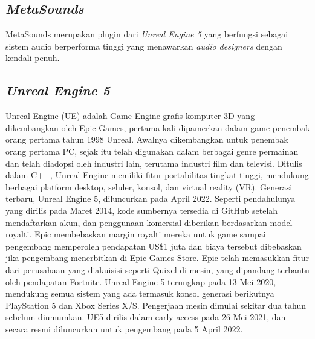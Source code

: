 \subsection{\emph{MetaSounds}}
MetaSounds merupakan plugin dari \emph{Unreal Engine 5} yang berfungsi sebagai sistem audio
berperforma tinggi yang menawarkan \emph{audio designers} dengan kendali penuh.

\subsection{\emph{Unreal Engine 5}}

Unreal Engine (UE) adalah Game Engine grafis komputer 3D yang dikembangkan oleh Epic Games, pertama kali dipamerkan dalam game penembak orang pertama tahun 1998 Unreal. 
Awalnya dikembangkan untuk penembak orang pertama PC, sejak itu telah digunakan dalam berbagai genre permainan dan telah diadopsi oleh industri lain, terutama industri film dan televisi. Ditulis dalam C++, 
Unreal Engine memiliki fitur portabilitas tingkat tinggi, mendukung berbagai platform desktop, seluler, konsol, dan virtual reality (VR).
Generasi terbaru, Unreal Engine 5, diluncurkan pada April 2022. Seperti pendahulunya yang dirilis pada Maret 2014, kode sumbernya tersedia di GitHub setelah mendaftarkan akun, dan penggunaan komersial diberikan 
berdasarkan model royalti. Epic membebaskan margin royalti mereka untuk game sampai pengembang memperoleh pendapatan US\$1 juta dan biaya tersebut dibebaskan jika pengembang menerbitkan di Epic Games Store. Epic telah memasukkan fitur dari perusahaan yang diakuisisi seperti Quixel di mesin, yang dipandang terbantu oleh pendapatan Fortnite.
Unreal Engine 5 terungkap pada 13 Mei 2020, mendukung semua sistem yang ada termasuk konsol generasi berikutnya PlayStation 5 dan Xbox Series X/S.\parencite{StattEpicAnnounce} Pengerjaan mesin dimulai sekitar dua 
tahun sebelum diumumkan.\parencite{DeanTakahashi} UE5 dirilis dalam early access pada 26 Mei 2021,\parencite{EddieMakuch} dan secara resmi diluncurkan untuk pengembang pada 5 April 2022.\parencite{UE5Launch}

